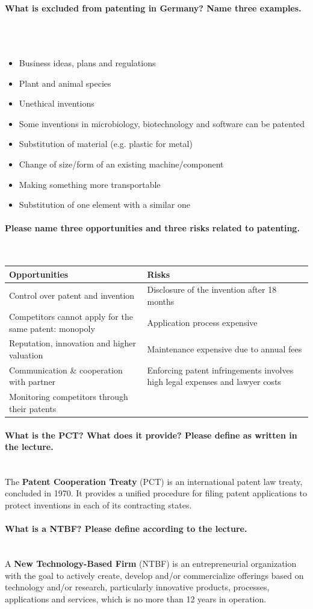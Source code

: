 \documentclass[10pt,a4paper,noendnumber=true]{scrartcl}
\newcommand{\properparagraph}[1]{\paragraph{\textcolor{Emerald}{#1}}\mbox{}\\}
\begin{document}
\properparagraph{What is excluded from patenting in Germany? Name three examples.}
\\[-6ex]
\begin{itemize}
	\item Business ideas, plans and regulations
	\item Plant and animal species
	\item Unethical inventions
	\item Some inventions in microbiology, biotechnology and software can be patented
	\item Substitution of material (e.g. plastic for metal)
	\item Change of size/form of an existing machine/component
	\item Making something more transportable
	\item Substitution of one element with a similar one
\end{itemize}

\properparagraph{Please name three opportunities and three risks related to patenting.}
\begin{table}[H]
		\centering
		\begin{tabularx}{\textwidth}{lX}
			\toprule
			\textbf{Opportunities} & \textbf{Risks} \\
			\midrule
			Control over patent and invention	& Disclosure of the invention after 18 months\\
			Competitors cannot apply for the same patent: monopoly			& Application process expensive\\
			Reputation, innovation and higher valuation	& Maintenance expensive due to annual fees\\
			Communication \& cooperation with partner	& Enforcing patent infringements involves high legal expenses and lawyer costs\\
			Monitoring competitors through their patents	& \\
			\bottomrule
		\end{tabularx}
\end{table}

\properparagraph{What is the PCT? What does it provide? Please define as written in the lecture.}
The \textbf{Patent Cooperation Treaty} (PCT) is an international patent law treaty, concluded in 1970. It provides a unified procedure for filing patent applications to protect inventions in each of its contracting states.

\properparagraph{What is a NTBF? Please define according to the lecture.}
A \textbf{New Technology-Based Firm} (NTBF) is an entrepreneurial organization with the goal to actively create, develop and/or commercialize offerings based on technology and/or research, particularly innovative products, processes, applications and services, which is no more than 12 years in operation.
\end{document}
